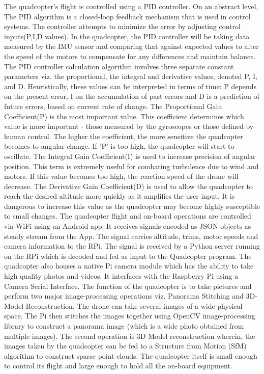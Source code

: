\newline
The quadcopter's flight is controlled using a PID controller. On an abstract level, The PID algorithm is a closed-loop feedback mechanism that is used in control systems. The controller attempts to minimize the error by adjusting control inputs(P,I,D values). In the quadcopter, the PID controller will be taking data measured by the IMU sensor and comparing that against expected values to alter the speed of the motors to compensate for any differences and maintain balance. The PID controller calculation algorithm involves three separate constant parameters viz. the proportional, the integral and derivative values, denoted P, I, and D. Heuristically, these values can be interpreted in terms of time: P depends on the present error, I on the accumulation of past errors and D is a prediction of future errors, based on current rate of change.
\newline
The Proportional Gain Coefficient(P) is the most important value. This coefficient determines which value is more important - those measured by the gyroscopes or those defined by human control. The higher the coefficient, the more sensitive the quadcopter becomes to angular change. If 'P' is too high, the quadcopter will start to oscillate. 
\newline
The Integral Gain Coefficient(I) is used to increase precision of angular position. This term is extremely useful for combating turbulence due to wind and motors. If this value becomes too high, the reaction speed of the drone will decrease.
\newline
The Derivative Gain Coefficient(D) is used to allow the quadcopter to reach the desired altitude more quickly as it amplifies the user input. It is dangerous to increase this value as the quadcopter may become highly susceptible to small changes.
\newline
The quadcopter flight and on-board operations are controlled via WiFi using an Android app. It receives signals encoded as JSON objects as steady stream from the App. The signal carries altitude, trims, motor speeds and camera information to the RPi. The signal is received by a Python server running on the RPi which is decoded and fed as input to the Quadcopter program.  
\newline
The quadcopter also houses a native Pi camera module which has the ability to take high quality photos and videos. It interfaces with the Raspberry Pi using a Camera Serial Interface. 
The function of the quadcopter is to take pictures and perform two major image-processing operations viz. Panorama Stitching and 3D-Model Reconstruction.
The drone can take several images of a wide physical space. The Pi then stitches the images together using OpenCV image-processing library to construct a panorama image (which is a wide photo obtained from multiple images). The second operation is 3D Model reconstruction wherein, the images taken by the quadcopter can be fed to a Structure from Motion (SfM) algorithm to construct sparse point clouds.
The quadcopter itself is small enough to control its flight and large enough to hold all the on-board equipment.


